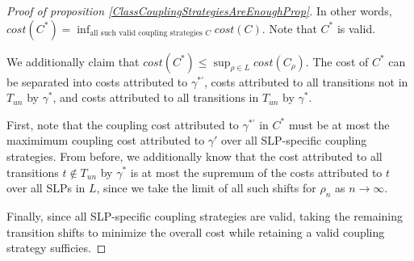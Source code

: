 \begin{proof}[Proof of proposition \ref{ClassCouplingStrategiesAreEnoughProp}]
    In other words, $cost(C^*) = \inf_{\text{all such valid coupling strategies } C} cost(C)$. Note that $C^*$ is valid. 

    We additionally claim that $cost(C^*)\leq \sup_{\rho\in L}cost(C_\rho)$. The cost of $C^*$ can be separated into costs attributed to $\gamma^{*\prime}$, costs attributed to all transitions not in $T_{un}$ by $\gamma^*$, and costs attributed to all transitions in $T_{un}$ by $\gamma^*$. 
    
    First, note that the coupling cost attributed to $\gamma^{*\prime}$ in $C^*$ must be at most the maximimum coupling cost attributed to $\gamma'$ over all SLP-specific coupling strategies. From before, we additionally know that the cost attributed to all transitions $t\notin T_{un}$ by $\gamma^*$ is at most the supremum of the costs attributed to $t$ over all SLPs in $L$, since we take the limit of all such shifts for $\rho_n$ as $n\to\infty$.

    Finally, since all SLP-specific coupling strategies are valid, taking the remaining transition shifts to minimize the overall cost while retaining a valid coupling strategy sufficies. 
\end{proof}


